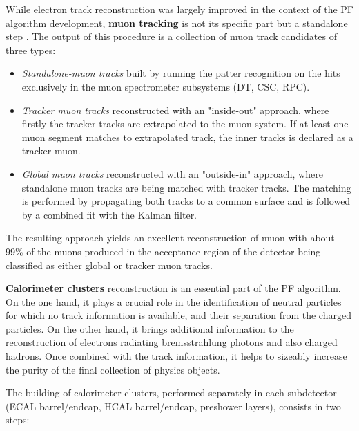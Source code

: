 While electron track reconstruction was largely improved in the context of the PF algorithm development, \textbf{muon tracking} is not its specific part but a standalone step \cite{CMS:2018rym}. The output of this procedure is a collection of muon track candidates of three types:

\begin{itemize}
    \item \textit{Standalone-muon tracks} built by running the patter recognition on the hits exclusively in the muon spectrometer subsystems (DT, CSC, RPC).
    \item \textit{Tracker muon tracks} reconstructed with an "inside-out" approach, where firstly the tracker tracks are extrapolated to the muon system. If at least one muon segment matches to extrapolated track, the inner tracks is declared as a tracker muon.
    \item \textit{Global muon tracks} reconstructed with an "outside-in" approach, where standalone muon tracks are being matched with tracker tracks. The matching is performed by propagating both tracks to a common surface and is followed by a combined fit with the Kalman filter. 
\end{itemize}
The resulting approach yields an excellent reconstruction of muon with about 99\% of the muons produced in the acceptance region of the detector being classified as either global or tracker muon tracks.

\textbf{Calorimeter clusters} reconstruction is an essential part of the PF algorithm. On the one hand, it plays a crucial role in the identification of neutral particles for which no track information is available, and their separation from the charged particles. On the other hand, it brings additional information to the reconstruction of electrons radiating bremsstrahlung  photons and also charged hadrons. Once combined with the track information, it helps to sizeably increase the purity of the final collection of physics objects.

The building of calorimeter clusters, performed separately in each subdetector (ECAL barrel/endcap, HCAL barrel/endcap, preshower layers), consists in two steps: 

